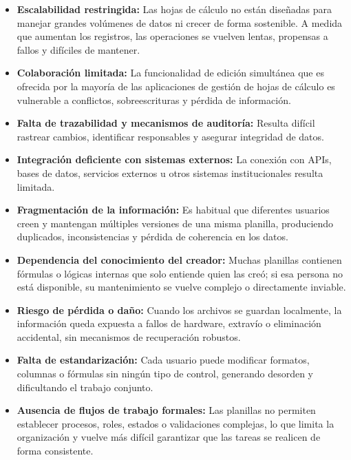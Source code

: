 \begin{itemize}
    \item \textbf{Escalabilidad restringida:} Las hojas de cálculo no están diseñadas para manejar grandes volúmenes de datos ni crecer de forma sostenible. A medida que aumentan los registros, las operaciones se vuelven lentas, propensas a fallos y difíciles de mantener.
    
    \item \textbf{Colaboración limitada:} La funcionalidad de edición simultánea que es ofrecida por la mayoría de las aplicaciones de gestión de hojas de cálculo es vulnerable a conflictos, sobreescrituras y pérdida de información.
    
    \item \textbf{Falta de trazabilidad y mecanismos de auditoría:} Resulta difícil rastrear cambios, identificar responsables y asegurar integridad de datos.
    
    \item \textbf{Integración deficiente con sistemas externos:} La conexión con APIs, bases de datos, servicios externos u otros sistemas institucionales resulta limitada.
    
    \item \textbf{Fragmentación de la información:} Es habitual que diferentes usuarios creen y mantengan múltiples versiones de una misma planilla, produciendo duplicados, inconsistencias y pérdida de coherencia en los datos.
    
    \item \textbf{Dependencia del conocimiento del creador:} Muchas planillas contienen fórmulas o lógicas internas que solo entiende quien las creó; si esa persona no está disponible, su mantenimiento se vuelve complejo o directamente inviable.
    
    \item \textbf{Riesgo de pérdida o daño:} Cuando los archivos se guardan localmente, la información queda expuesta a fallos de hardware, extravío o eliminación accidental, sin mecanismos de recuperación robustos.
    
    \item \textbf{Falta de estandarización:} Cada usuario puede modificar formatos, columnas o fórmulas sin ningún tipo de control, generando desorden y dificultando el trabajo conjunto.
    
    \item \textbf{Ausencia de flujos de trabajo formales:} Las planillas no permiten establecer procesos, roles, estados o validaciones complejas, lo que limita la organización y vuelve más difícil garantizar que las tareas se realicen de forma consistente.
\end{itemize}

